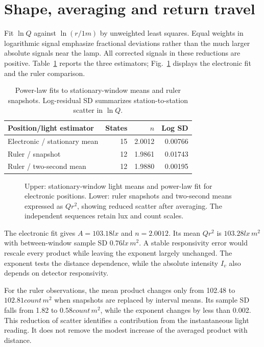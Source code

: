 \section{Shape, averaging and return travel}
Fit $\ln Q$ against $\ln(r/1\unit{m})$ by unweighted least squares. Equal weights in logarithmic signal emphasize fractional deviations rather than the much larger absolute signals near the lamp. All corrected signals in these reductions are positive. Table~\ref{tab:illuminance-distance-fits} reports the three estimators; Fig.~\ref{fig:illuminance-distance-results} displays the electronic fit and the ruler comparison.

\begin{table}[t]
\caption{Power-law fits to stationary-window means and ruler snapshots. Log-residual SD summarizes station-to-station scatter in $\ln Q$.}
\label{tab:illuminance-distance-fits}
\centering\small
\begin{tabular}{@{}lrrr@{}}
\toprule
Position/light estimator & States & $n$ & Log SD\\
\midrule
Electronic / stationary mean & 15 & 2.0012 & 0.00766\\
Ruler / snapshot & 12 & 1.9861 & 0.01743\\
Ruler / two-second mean & 12 & 1.9880 & 0.00195\\
\bottomrule
\end{tabular}
\end{table}

\begin{figure}[t]
\centering
\caption{Upper: stationary-window light means and power-law fit for electronic positions. Lower: ruler snapshots and two-second means expressed as $Qr^2$, showing reduced scatter after averaging. The independent sequences retain lux and count scales.}
\label{fig:illuminance-distance-results}
\end{figure}

The electronic fit gives $A=103.18\unit{lx}$ and $n=2.0012$. Its mean $Qr^2$ is $103.28\unit{lx\,m^2}$ with between-window sample SD $0.76\unit{lx\,m^2}$. A stable responsivity error would rescale every product while leaving the exponent largely unchanged. The exponent tests the distance dependence, while the absolute intensity $I_v$ also depends on detector responsivity.

For the ruler observations, the mean product changes only from 102.48 to $102.81\unit{count\,m^2}$ when snapshots are replaced by interval means. Its sample SD falls from 1.82 to $0.58\unit{count\,m^2}$, while the exponent changes by less than 0.002. This reduction of scatter identifies a contribution from the instantaneous light reading. It does not remove the modest increase of the averaged product with distance.

